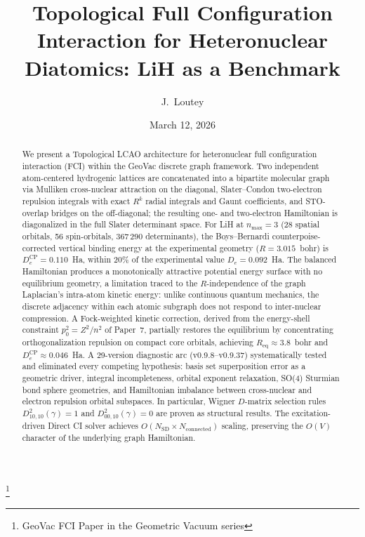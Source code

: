 \documentclass[aps,pra,twocolumn,superscriptaddress,longbibliography]{revtex4-2}
\begin{document}
\title{Topological Full Configuration Interaction for Heteronuclear\\
Diatomics: LiH as a Benchmark}
\thanks{GeoVac FCI Paper in the Geometric Vacuum series}

\author{J.~Loutey}

\date{March 12, 2026}


\begin{abstract}
We present a Topological LCAO architecture for heteronuclear full
configuration interaction (FCI) within the GeoVac discrete graph
framework.  Two independent atom-centered hydrogenic lattices are
concatenated into a bipartite molecular graph via Mulliken cross-nuclear
attraction on the diagonal, Slater--Condon two-electron repulsion
integrals with exact $R^k$ radial integrals and Gaunt coefficients, and
STO-overlap bridges on the off-diagonal; the resulting one- and
two-electron Hamiltonian is diagonalized in the full Slater determinant
space.  For LiH at $n_{\max}=3$ (28 spatial orbitals, 56 spin-orbitals,
367\,290 determinants), the Boys--Bernardi counterpoise-corrected vertical
binding energy at the experimental geometry ($R=3.015$~bohr) is
$D_{e}^{\mathrm{CP}}=0.110$~Ha, within 20\% of the experimental value
$D_{e}=0.092$~Ha.  The balanced Hamiltonian produces a monotonically
attractive potential energy surface with no equilibrium geometry, a
limitation traced to the $R$-independence of the graph Laplacian's
intra-atom kinetic energy: unlike continuous quantum mechanics, the
discrete adjacency within each atomic subgraph does not respond to
inter-nuclear compression.  A Fock-weighted kinetic correction, derived
from the energy-shell constraint $p_0^2 = Z^2/n^2$ of Paper~7, partially
restores the equilibrium by concentrating orthogonalization repulsion on
compact core orbitals, achieving $R_{\mathrm{eq}}\approx 3.8$~bohr and
$D_e^{\mathrm{CP}}\approx 0.046$~Ha.  A 29-version diagnostic arc
(v0.9.8--v0.9.37) systematically tested and eliminated every competing
hypothesis: basis set superposition error as a geometric driver, integral
incompleteness, orbital exponent relaxation, SO(4) Sturmian bond sphere
geometries, and Hamiltonian imbalance between cross-nuclear and
electron repulsion orbital subspaces.  In particular, Wigner $D$-matrix
selection rules $D^{2}_{10,10}(\gamma)=1$ and
$D^{2}_{00,10}(\gamma)=0$ are proven as structural results.  The
excitation-driven Direct CI solver achieves
$O(N_{\mathrm{SD}}\times N_{\mathrm{connected}})$ scaling, preserving the
$O(V)$ character of the underlying graph Hamiltonian.
\end{abstract}
\end{document}
